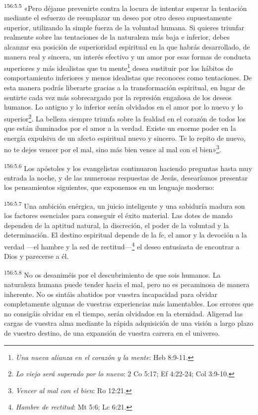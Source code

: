 \par
\textsuperscript{156:5.5} «Pero déjame prevenirte contra la locura de intentar superar la tentación mediante el esfuerzo de reemplazar un deseo por otro deseo supuestamente superior, utilizando la simple fuerza de la voluntad humana. Si quieres triunfar realmente sobre las tentaciones de la naturaleza más baja e inferior, debes alcanzar esa posición de superioridad espiritual en la que habrás desarrollado, de manera real y sincera, un interés efectivo y un amor por esas formas de conducta superiores y más idealistas que tu mente\footnote{\textit{Una nueva alianza en el corazón y la mente}: Heb 8:9-11.} desea sustituir por los hábitos de comportamiento inferiores y menos idealistas que reconoces como tentaciones. De esta manera podrás liberarte gracias a la transformación espiritual, en lugar de sentirte cada vez más sobrecargado por la represión engañosa de los deseos humanos. Lo antiguo y lo inferior serán olvidados en el amor por lo nuevo y lo superior\footnote{\textit{Lo viejo será superado por lo nuevo}: 2 Co 5:17; Ef 4:22-24; Col 3:9-10.}. La belleza siempre triunfa sobre la fealdad en el corazón de todos los que están iluminados por el amor a la verdad. Existe un enorme poder en la energía expulsiva de un afecto espiritual nuevo y sincero. Te lo repito de nuevo, no te dejes vencer por el mal, sino más bien vence al mal con el bien»\footnote{\textit{Vencer al mal con el bien}: Ro 12:21.}.

\par
\textsuperscript{156:5.6} Los apóstoles y los evangelistas continuaron haciendo preguntas hasta muy entrada la noche, y de las numerosas respuestas de Jesús, desearíamos presentar los pensamientos siguientes, que exponemos en un lenguaje moderno:

\par
\textsuperscript{156:5.7} Una ambición enérgica, un juicio inteligente y una sabiduría madura son los factores esenciales para conseguir el éxito material. Las dotes de mando dependen de la aptitud natural, la discreción, el poder de la voluntad y la determinación. El destino espiritual depende de la fe, el amor y la devoción a la verdad ---el hambre y la sed de rectitud---\footnote{\textit{Hambre de rectitud}: Mt 5:6; Lc 6:21.} el deseo entusiasta de encontrar a Dios y parecerse a él.

\par
\textsuperscript{156:5.8} No os desaniméis por el descubrimiento de que sois humanos. La naturaleza humana puede tender hacia el mal, pero no es pecaminosa de manera inherente. No os sintáis abatidos por vuestra incapacidad para olvidar completamente algunas de vuestras experiencias más lamentables. Los errores que no consigáis olvidar en el tiempo, serán olvidados en la eternidad. Aligerad las cargas de vuestra alma mediante la rápida adquisición de una visión a largo plazo de vuestro destino, de una expansión de vuestra carrera en el universo.

